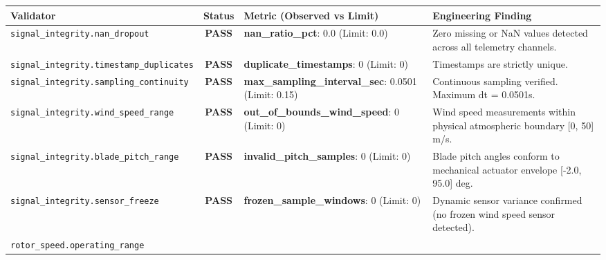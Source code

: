 \documentclass[10pt,a4paper]{article}
\begin{document}
\begin{table}[h!]
\small
\centering
\begin{tabularx}{\textwidth}{lcp{3.5cm}X}
    \toprule
    \textbf{Validator} & \textbf{Status} & \textbf{Metric (Observed vs Limit)} & \textbf{Engineering Finding} \\
    \midrule
    
    \texttt{signal_integrity.nan_dropout} & 
    
        \textcolor{PassGreen}{\textbf{PASS}}
     & 
    \textbf{nan_ratio_pct}: 0.0 (Limit: 0.0) & 
    Zero missing or NaN values detected across all telemetry channels. \\
    \midrule
    
    \texttt{signal_integrity.timestamp_duplicates} & 
    
        \textcolor{PassGreen}{\textbf{PASS}}
     & 
    \textbf{duplicate_timestamps}: 0 (Limit: 0) & 
    Timestamps are strictly unique. \\
    \midrule
    
    \texttt{signal_integrity.sampling_continuity} & 
    
        \textcolor{PassGreen}{\textbf{PASS}}
     & 
    \textbf{max_sampling_interval_sec}: 0.0501 (Limit: 0.15) & 
    Continuous sampling verified. Maximum dt = 0.0501s. \\
    \midrule
    
    \texttt{signal_integrity.wind_speed_range} & 
    
        \textcolor{PassGreen}{\textbf{PASS}}
     & 
    \textbf{out_of_bounds_wind_speed}: 0 (Limit: 0) & 
    Wind speed measurements within physical atmospheric boundary [0, 50] m/s. \\
    \midrule
    
    \texttt{signal_integrity.blade_pitch_range} & 
    
        \textcolor{PassGreen}{\textbf{PASS}}
     & 
    \textbf{invalid_pitch_samples}: 0 (Limit: 0) & 
    Blade pitch angles conform to mechanical actuator envelope [-2.0, 95.0] deg. \\
    \midrule
    
    \texttt{signal_integrity.sensor_freeze} & 
    
        \textcolor{PassGreen}{\textbf{PASS}}
     & 
    \textbf{frozen_sample_windows}: 0 (Limit: 0) & 
    Dynamic sensor variance confirmed (no frozen wind speed sensor detected). \\
    \midrule
    
    \texttt{rotor_speed.operating_range} & 
    

\end{tabularx}
\end{table}
\end{document}
